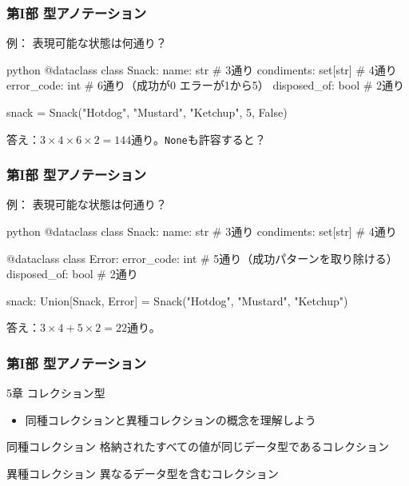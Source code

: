 \documentclass[aspectratio=169,dvipdfmx,12pt,notheorems]{beamer}
\theoremstyle{definition}
\begin{document}
\begin{frame}[fragile]\frametitle{第I部 型アノテーション}

\begin{exampleblock}{例： 表現可能な状態は何通り？}
\begin{pygments}{python}
@dataclass
class Snack:
    name: str # 3通り
    condiments: set[str] # 4通り
    error_code: int # 6通り（成功が0 エラーが1から5）
    disposed_of: bool # 2通り
    
snack = Snack("Hotdog", {"Mustard", "Ketchup"}, 5, False)
\end{pygments}
\end{exampleblock}
答え：$3 \times 4 \times 6 \times 2 = 144$通り。\texttt{None}も許容すると？
\end{frame}

\begin{frame}[fragile]\frametitle{第I部 型アノテーション}

\begin{exampleblock}{例： 表現可能な状態は何通り？}
\begin{pygments}{python}
@dataclass
class Snack:
    name: str  # 3通り
    condiments: set[str]  # 4通り

@dataclass 
class Error:
    error_code: int # 5通り（成功パターンを取り除ける）
    disposed_of: bool  # 2通り

snack: Union[Snack, Error] = Snack("Hotdog", {"Mustard", "Ketchup"})
\end{pygments}
\end{exampleblock}
答え：$3 \times 4 + 5 \times 2 = 22$通り。
\end{frame}


\begin{frame}\frametitle{第I部 型アノテーション}

\begin{block}{5章 コレクション型}
\begin{itemize}
\item 同種コレクションと異種コレクションの概念を理解しよう
\end{itemize}
\end{block}

\begin{exampleblock}{同種コレクション}
格納されたすべての値が同じデータ型であるコレクション
\end{exampleblock}

\begin{exampleblock}{異種コレクション}
異なるデータ型を含むコレクション
\end{exampleblock}

\end{frame}
\end{document}
